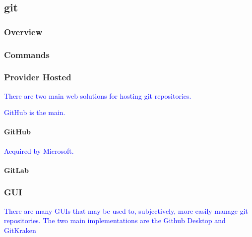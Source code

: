\subsection{git}

\subsubsection{Overview}

\subsubsection{Commands}

\subsubsection{Provider Hosted}

\textcolor{blue}{There are two main web solutions for hosting git repositories.}

\textcolor{blue}{GitHub is the main.}


\paragraph{GitHub}

\textcolor{blue}{Acquired by Microsoft.}

\paragraph{GitLab}


\subsubsection{GUI}

\textcolor{blue}{There are many GUIs that may be used to, subjectively, more easily manage git repositories. The two main implementations are the Github Desktop and GitKraken}
